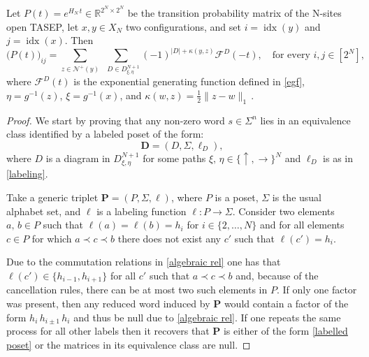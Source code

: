 \documentclass{article}
\begin{document}
\begin{theorem}
    \label{prob matrix theorem}
    Let $P(t)=e^{H_N\,t}\in\mathbb{R}^{2^N\times 2^N}$ be the transition probability matrix of the N-sites open TASEP, let $x,y\in X_N$ two configurations, and set $i=\operatorname{idx}(y)$ and $j=\operatorname{idx}(x)$. Then
    \[\big(P(t)\big)_{ij}=\sum_{z\in\mathcal{N}^+(y)}\sum_{\ \ \ D\in D^{N+1}_{\xi,\eta}} (-1)^{|D|+\kappa(y,z)}\mathcal{F}^D(-t),
    \quad \text{for every $i,j\in [2^N]$,}
    \]
    where $\mathcal{F}^{D}(t)$ is the exponential generating function defined in \eqref{egf}, $\eta=g^{-1}(z)$, $\xi=g^{-1}(x)$, and $\kappa(w,z)=\frac12\|z-w\|_1$\,.
\end{theorem}
\begin{proof}
    We start by proving that any non-zero word $s\in\Sigma^n$ lies in an equivalence class identified by a labeled poset of the form:
    \begin{equation}
    \label{labelled poset}
    \boldsymbol{D}=(D,\Sigma,\ell_D),
    \end{equation}
    where $D$ is a diagram in $D^{N+1}_{\xi,\eta}$ for some paths $\xi,\,\eta\in\{\uparrow,\rightarrow\}^N$ and $\ell_D$ is as in \eqref{labeling}.
    
    Take a generic triplet $\boldsymbol{P}=(P,\Sigma,\ell)$, where $P$ is a poset, $\Sigma$ is the usual alphabet set, and $\ell$ is a labeling function $\ell\colon P\to\Sigma$. Consider two elements $a,\, b\in P$ such that $\ell(a)=\ell(b)=h_i$ for $i\in\{2,\dots,N\}$ and for all elements $c\in P$ for which $a\prec c\prec b$ there does not exist any $c'$ such that $\ell(c')=h_i$.

    Due to the commutation relations in \eqref{algebraic rel} one has that $\ell(c')\in\{h_{i-1},h_{i+1}\}$ for all $c'$ such that $a\prec c\prec b$  and, because of the cancellation rules, there can be at most two such elements in $P$. If only one factor was present, then any reduced word induced by $\boldsymbol{P}$ would contain a factor of the form $h_i \, h_{i\pm 1}\, h_i$ and thus be null due to \eqref{algebraic rel}. If one repeats the same process for all other labels then it recovers that $\boldsymbol{P}$ is either of the form \eqref{labelled poset} or the matrices in its equivalence class are null.
    

\end{proof}
\end{document}
